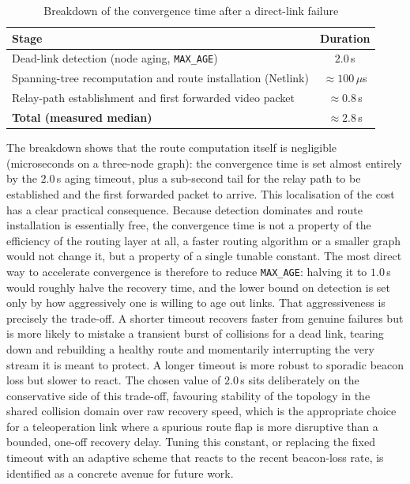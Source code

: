 \vspace{0.4cm}
\begin{table}[h]
\centering
\caption{Breakdown of the convergence time after a direct-link failure}
\label{tab:conv-breakdown}
\begin{tabular}{lc}
\toprule
\textbf{Stage} & \textbf{Duration} \\
\midrule
Dead-link detection (node aging, \texttt{MAX\_AGE}) & $2.0$\,s \\
Spanning-tree recomputation and route installation (Netlink) & $\approx 100\,\mu$s \\
Relay-path establishment and first forwarded video packet & $\approx 0.8$\,s \\
\midrule
\textbf{Total (measured median)} & $\approx 2.8$\,s \\
\bottomrule
\end{tabular}
\end{table}
\vspace{0.5cm}

The breakdown shows that the route computation itself is negligible
(microseconds on a three-node graph): the convergence time is set almost
entirely by the $2.0$\,s aging timeout, plus a sub-second tail for the relay
path to be established and the first forwarded packet to arrive. This
localisation of the cost has a clear practical consequence. Because detection
dominates and route installation is essentially free, the convergence time is
not a property of the efficiency of the routing layer at all, a faster routing
algorithm or a smaller graph would not change it, but a property of a single
tunable constant. The most direct way to accelerate convergence is therefore to
reduce \texttt{MAX\_AGE}: halving it to $1.0$\,s would roughly halve the
recovery time, and the lower bound on detection is set only by how aggressively
one is willing to age out links. That aggressiveness is precisely the trade-off.
A shorter timeout recovers faster from genuine failures but is more likely to
mistake a transient burst of collisions for a dead link, tearing down and
rebuilding a healthy route and momentarily interrupting the very stream it is
meant to protect. A longer timeout is more robust to sporadic beacon loss but
slower to react. The chosen value of $2.0$\,s sits deliberately on the
conservative side of this trade-off, favouring stability of the topology in the
shared collision domain over raw recovery speed, which is the appropriate
choice for a teleoperation link where a spurious route flap is more disruptive
than a bounded, one-off recovery delay. Tuning this constant, or replacing the
fixed timeout with an adaptive scheme that reacts to the recent beacon-loss
rate, is identified as a concrete avenue for future work.

